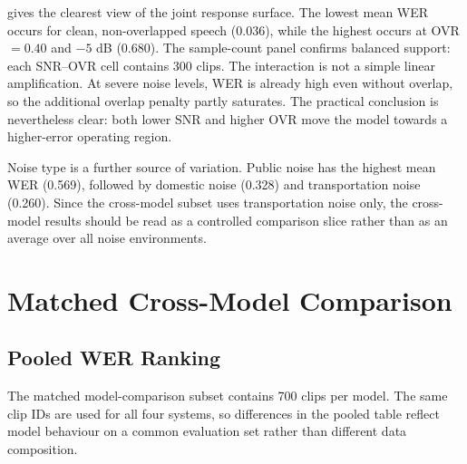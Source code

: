  gives the clearest view of the joint response surface. The
lowest mean WER occurs for clean, non-overlapped speech (0.036), while the highest occurs at
OVR \(=0.40\) and \(-5\) dB (0.680). The sample-count panel confirms balanced support: each
SNR--OVR cell contains 300 clips. The interaction is not a simple linear amplification. At
severe noise levels, WER is already high even without overlap, so the additional overlap penalty
partly saturates. The practical conclusion is nevertheless clear: both lower SNR and higher OVR
move the model towards a higher-error operating region.

Noise type is a further source of variation. Public noise has the highest mean WER (0.569),
followed by domestic noise (0.328) and transportation noise (0.260). Since the cross-model
subset uses transportation noise only, the cross-model results should be read as a controlled
comparison slice rather than as an average over all noise environments.


\section{Matched Cross-Model Comparison}
\subsection{Pooled WER Ranking}
The matched model-comparison subset contains 700 clips per model. The same clip IDs are used for
all four systems, so differences in the pooled table reflect model behaviour on a common
evaluation set rather than different data composition.



